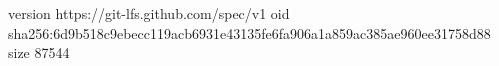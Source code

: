 version https://git-lfs.github.com/spec/v1
oid sha256:6d9b518c9ebecc119acb6931e43135fe6fa906a1a859ac385ae960ee31758d88
size 87544
